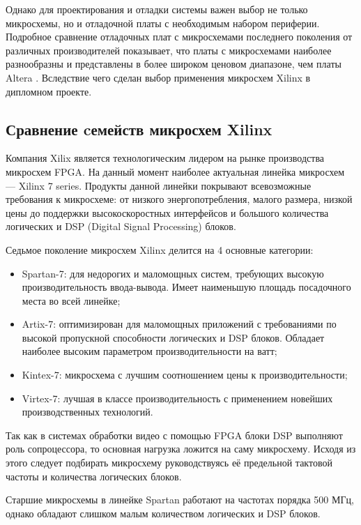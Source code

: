 Однако для проектирования и отладки системы важен выбор не только микросхемы,
но и отладочной платы с необходимым набором периферии. Подробное сравнение отладочных
плат с микросхемами последнего поколения от различных производителей показывает, что
платы с микросхемами  наиболее разнообразны и представлены в более широком ценовом диапазоне,
чем платы Altera \cite{fpga_boards_comparison}.
Вследствие чего сделан выбор применения микросхем Xilinx в дипломном проекте.

\subsection{Сравнение cемейств микросхем Xilinx}
\label{sub:domain:fpga_comparison}

Компания Xilix является технологическим лидером на рынке производства микросхем FPGA.
На данный момент наиболее актуальная линейка микросхем --- Xilinx 7 series\cite{7_series_overview}.
Продукты данной линейки покрывают всевозможные требования к микросхеме: от низкого энергопотребления, малого размера, низкой цены до
поддержки высокоскоростных интерфейсов и большого количества логических и DSP (Digital Signal Processing) блоков.

Седьмое поколение микросхем Xilinx делится на 4 основные категории:
\begin{itemize}
  \item Spartan-7: для недорогих и маломощных систем, требующих высокую производительность ввода-вывода.
    Имеет наименьшую площадь посадочного места во всей линейке;
  \item Artix-7: оптимизирован для маломощных приложений с требованиями по высокой пропускной способности логических и DSP блоков.
    Обладает наиболее высоким параметром производительности на ватт;
  \item Kintex-7: микросхема с лучшим соотношением цены к производительности;
  \item Virtex-7: лучшая в классе производительность с применением новейших производственных технологий.
\end{itemize}

Так как в системах обработки видео с помощью FPGA блоки DSP выполняют роль сопроцессора, то
основная нагрузка ложится на саму микросхему. Исходя из этого следует подбирать микросхему
руководствуясь её предельной тактовой частоты и количества логических блоков\cite{7_series_selection_guide}.

Старшие микросхемы в линейке Spartan работают на частотах порядка 500 МГц, однако обладают слишком малым количеством
логических и DSP блоков.

